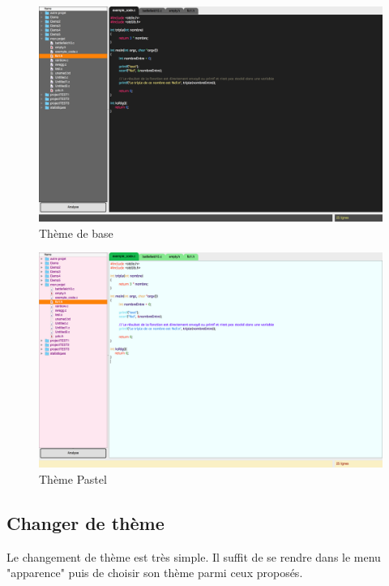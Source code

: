 \documentclass[a4paper,12pt]{article}
\begin{document}
		\begin{figure}[h!]
			\begin{center}
				\includegraphics[scale=0.17]{imgs/theme_basic}
				\caption{Thème de base}
			\end{center}
		\end{figure}
		
		\begin{figure}[h!]
			\begin{center}
				\includegraphics[scale=0.17]{imgs/theme_pastel}
				\caption{Thème Pastel}
			\end{center}
		\end{figure}
		
		\subsection{Changer de thème}
		
			Le changement de thème est très simple. Il suffit de se rendre dans le menu "apparence" puis de choisir son thème parmi ceux proposés.
	
\end{document}
